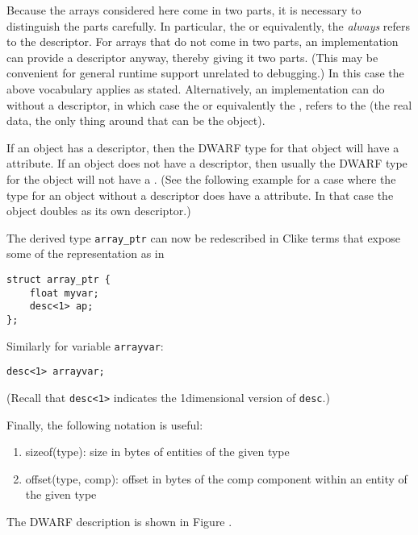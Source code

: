 Because the arrays considered here come in two parts, it is
necessary to distinguish the parts carefully. In particular,
the  or equivalently, the  \emph{always} refers to the descriptor. For
arrays that do not come in two parts, an implementation can
provide a descriptor anyway, thereby giving it two parts. (This
may be convenient for general runtime support unrelated to
debugging.) In this case the above vocabulary applies as
stated. Alternatively, an implementation can do without a
descriptor, in which case the 
or equivalently the , refers
to the  (the real data, the only thing around
that can be the object).

If an object has a descriptor, then the DWARF type for that
object will have a 
\DWATdatalocation{} 
attribute. If an object
does not have a descriptor, then usually the DWARF type for the
object will not have a 
\DWATdatalocation. 
(See the following
 example for a case where the type for an object without
a descriptor does have a 
\DWATdatalocation{} attribute. In
that case the object doubles as its own descriptor.)

The  derived type \texttt{array\_ptr} can now be redescribed
in C\dash like terms that expose some of the representation as in

\begin{lstlisting}[numbers=none]
struct array_ptr {
    float myvar;
    desc<1> ap;
};
\end{lstlisting}

Similarly for variable \texttt{arrayvar}:
\begin{lstlisting}[numbers=none]
desc<1> arrayvar;
\end{lstlisting}

(Recall that \texttt{desc\textless 1\textgreater} 
indicates the 1\dash dimensional version of \texttt{desc}.)

\newpage
Finally, the following notation is useful:
\begin{enumerate}[1. ]
\item  sizeof(type): size in bytes of entities of the given type
\item offset(type, comp): offset in bytes of the comp component
within an entity of the given type
\end{enumerate}

The DWARF description is shown 
in Figure .

